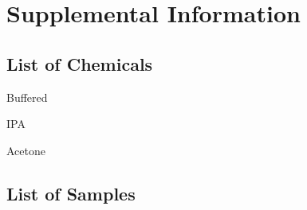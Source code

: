 \chapter{Supplemental Information}
\label{chap:appendix}
\thispagestyle{empty}


\section{List of Chemicals}
\label{sup:LoChemicals}





Buffered 





IPA

Acetone

\clearpage


\section{List of Samples}
\label{sup:LoSamples}



